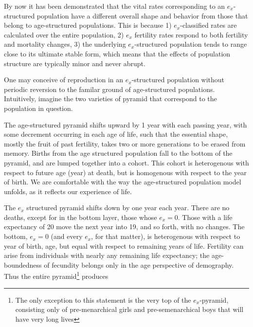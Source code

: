 
By now it has been demonstrated that the vital rates corresponding to an
$e_x$-structured population have a different overall shape and behavior from
those that belong to age-structured populations. This is because 1) $e_x$-classified rates
are calculated over the entire population, 2) $e_x$ fertility rates respond to
both fertility and mortality changes, 3) the underlying $e_x$-structured
population tends to range close to its ultimate stable form, which means that
the effects of population structure are typically minor and never abrupt.

One may conceive of reproduction in an $e_x$-structured population without
periodic reversion to the familar ground of age-structured populations.
Intuitively, imagine the two varieties of pyramid that correspond to the
population in question. 

The age-structured pyramid shifts upward by 1 year with
each passing year, with some decrement occurring in each age of life, such that
the essential shape, mostly the fruit of past fertility, takes two or more
generations to be erased from memory. Births from the age structured population
fall to the bottom of the pyramid, and are lumped together into a cohort. This
cohort is heterogenous with respect to future age (year) at death, but is
homogenous with respect to the year of birth. We are comfortable with
the way the age-structured population model unfolds, as it
reflects our experience of life.

The $e_x$ structured pyramid shifts down by one year each year. There are no
deaths, except for in the bottom layer, those whose $e_x = 0$. Those with a life
expectancy of 20 move the next year into 19, and so forth, with no changes. The
bottom, $e_x = 0$ (and every $e_x$, for that matter), is heterogenous with
respect to year of birth, age, but equal with respect to remaining years of
life. Fertility can arise from individuals with nearly any remaining life
expectancy; the age-boundedness of fecundity belongs only in the age
perspective of demography. Thus the entire pyramid\footnote{The only exception
to this statement is the very top of the $e_x$-pyramid, consisting only of
pre-menarchical girls and pre-semenarchical boys that will have very long lives}
produces








